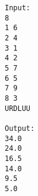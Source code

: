 \begin{verbatim}
Input:
8
1 6
2 4
3 1
4 2
5 7
6 5
7 9
8 3
URDLUU

Output:
34.0
24.0
16.5
14.0
9.5
5.0
\end{verbatim}